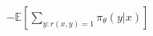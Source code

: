 \documentclass[preview]{standalone}
\begin{document}
\begin{align*}
-\mathbb{E}\left[\sum_{y:r(x,y)=1}\pi_\theta(y|x)\right]
\end{align*}
\end{document}
